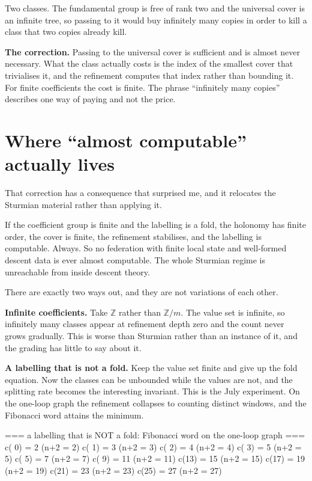 \documentclass[11pt,a4paper]{article}
\begin{document}
Two classes. The fundamental group is free of rank two and the universal cover
is an infinite tree, so passing to it would buy infinitely many copies in order
to kill a class that two copies already kill.

\begin{sectionbox}
\textbf{The correction.} Passing to the universal cover is sufficient and is
almost never necessary. What the class actually costs is the index of the
smallest cover that trivialises it, and the refinement computes that index
rather than bounding it. For finite coefficients the cost is finite. The phrase
``infinitely many copies'' describes one way of paying and not the price.
\end{sectionbox}

\section{Where ``almost computable'' actually lives}

That correction has a consequence that surprised me, and it relocates the
Sturmian material rather than applying it.

If the coefficient group is finite and the labelling is a fold, the holonomy has
finite order, the cover is finite, the refinement stabilises, and the labelling
is computable. Always. So no federation with finite local state and well-formed
descent data is ever almost computable. The whole Sturmian regime is unreachable
from inside descent theory.

There are exactly two ways out, and they are not variations of each other.

\textbf{Infinite coefficients.} Take $\mathbb{Z}$ rather than $\mathbb{Z}/m$.
The value set is infinite, so infinitely many classes appear at refinement depth
zero and the count never grows gradually. This is worse than Sturmian rather
than an instance of it, and the grading has little to say about it.

\textbf{A labelling that is not a fold.} Keep the value set finite and give up
the fold equation. Now the classes can be unbounded while the values are not,
and the splitting rate becomes the interesting invariant. This is the July
experiment. On the one-loop graph the refinement collapses to counting distinct
windows, and the Fibonacci word attains the minimum.

\begin{term}
=== a labelling that is NOT a fold: Fibonacci word on the one-loop graph ===
  c( 0) =   2   (n+2 = 2)
  c( 1) =   3   (n+2 = 3)
  c( 2) =   4   (n+2 = 4)
  c( 3) =   5   (n+2 = 5)
  c( 5) =   7   (n+2 = 7)
  c( 9) =  11   (n+2 = 11)
  c(13) =  15   (n+2 = 15)
  c(17) =  19   (n+2 = 19)
  c(21) =  23   (n+2 = 23)
  c(25) =  27   (n+2 = 27)
\end{term}
\end{document}
